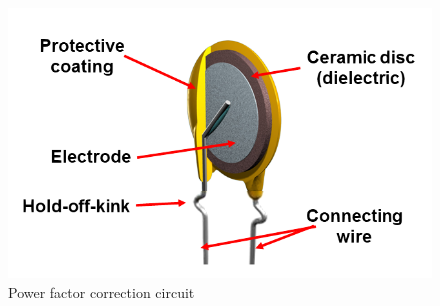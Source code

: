 \begin{figure}
\includegraphics[keepaspectratio=true,scale=.5]{./figures/powerFactor.png}
\centering
\caption{Power factor correction circuit}
\label{powerFactor}
\end{figure}
